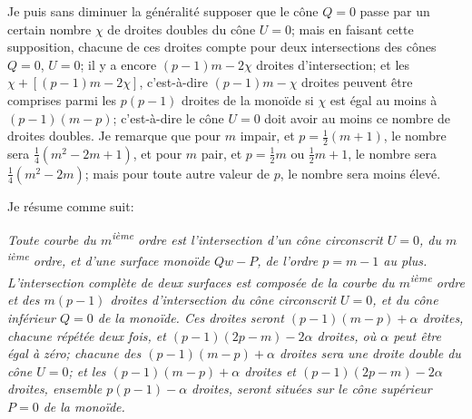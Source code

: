\documentclass[11pt,a4paper]{article}
\begin{document}
\clearpage

Je puis sans diminuer la g\'{e}n\'{e}ralit\'{e} supposer que le c\^{o}ne $Q = 0$ passe par un certain nombre $\chi$ de droites doubles du c\^{o}ne $U = 0$; mais en faisant cette supposition, chacune de ces droites compte pour deux intersections des c\^{o}nes $Q = 0$, $U = 0$; il y a encore $(p-1)m - 2\chi$ droites d'intersection; et les $\chi + [(p-1)m - 2\chi]$, c'est-\`{a}-dire $(p-1)m - \chi$ droites peuvent \^{e}tre comprises parmi les $p(p-1)$ droites de la mono\"{i}de si $\chi$ est \'{e}gal au moins \`{a} $(p-1)(m-p)$; c'est-\`{a}-dire le c\^{o}ne $U = 0$ doit avoir au moins ce nombre de droites doubles. Je remarque que pour $m$ impair, et $p = \frac{1}{2}(m+1)$, le nombre sera $\frac{1}{4}(m^2 - 2m + 1)$, et pour $m$ pair, et $p = \frac{1}{2}m$ ou $\frac{1}{2}m + 1$, le nombre sera $\frac{1}{4}(m^2 - 2m)$; mais pour toute autre valeur de $p$, le nombre sera moins \'{e}lev\'{e}.

Je r\'{e}sume comme suit:

\medskip
\noindent\textit{Toute courbe du $m$\textsuperscript{i\`{e}me} ordre est l'intersection d'un c\^{o}ne circonscrit $U = 0$, du $m$\textsuperscript{i\`{e}me} ordre, et d'une surface mono\"{i}de $Qw - P$, de l'ordre $p = m-1$ au plus. L'intersection compl\`{e}te de deux surfaces est compos\'{e}e de la courbe du $m$\textsuperscript{i\`{e}me} ordre et des $m(p-1)$ droites d'intersection du c\^{o}ne circonscrit $U = 0$, et du c\^{o}ne inf\'{e}rieur $Q = 0$ de la mono\"{i}de. Ces droites seront $(p-1)(m-p) + \alpha$ droites, chacune r\'{e}p\'{e}t\'{e}e deux fois, et $(p-1)(2p-m) - 2\alpha$ droites, o\`{u} $\alpha$ peut \^{e}tre \'{e}gal \`{a} z\'{e}ro; chacune des $(p-1)(m-p) + \alpha$ droites sera une droite double du c\^{o}ne $U = 0$; et les $(p-1)(m-p) + \alpha$ droites et $(p-1)(2p-m) - 2\alpha$ droites, ensemble $p(p-1) - \alpha$ droites, seront situ\'{e}es sur le c\^{o}ne sup\'{e}rieur $P = 0$ de la mono\"{i}de.}
\medskip
\end{document}
